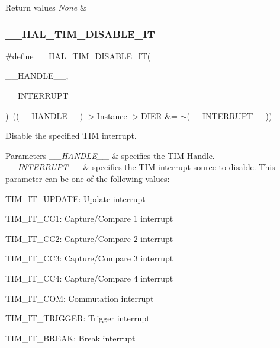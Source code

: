 \begin{DoxyRetVals}{Return values}
{\em None} & \\
\hline
\end{DoxyRetVals}
\mbox{\label{group___t_i_m___exported___macros_ga31d67e905bc62e3142179dc4bbf8ba64}} 
\subsubsection{\texorpdfstring{\+\_\+\+\_\+\+H\+A\+L\+\_\+\+T\+I\+M\+\_\+\+D\+I\+S\+A\+B\+L\+E\+\_\+\+IT}{\_\_HAL\_TIM\_DISABLE\_IT}}
{\footnotesize\ttfamily \#define \+\_\+\+\_\+\+H\+A\+L\+\_\+\+T\+I\+M\+\_\+\+D\+I\+S\+A\+B\+L\+E\+\_\+\+IT(\begin{DoxyParamCaption}\item[{}]{\+\_\+\+\_\+\+H\+A\+N\+D\+L\+E\+\_\+\+\_\+,  }\item[{}]{\+\_\+\+\_\+\+I\+N\+T\+E\+R\+R\+U\+P\+T\+\_\+\+\_\+ }\end{DoxyParamCaption})~((\+\_\+\+\_\+\+H\+A\+N\+D\+L\+E\+\_\+\+\_\+)-\/$>$Instance-\/$>$D\+I\+ER \&= $\sim$(\+\_\+\+\_\+\+I\+N\+T\+E\+R\+R\+U\+P\+T\+\_\+\+\_\+))}



Disable the specified T\+IM interrupt. 


\begin{DoxyParams}{Parameters}
{\em \+\_\+\+\_\+\+H\+A\+N\+D\+L\+E\+\_\+\+\_\+} & specifies the T\+IM Handle. \\
\hline
{\em \+\_\+\+\_\+\+I\+N\+T\+E\+R\+R\+U\+P\+T\+\_\+\+\_\+} & specifies the T\+IM interrupt source to disable. This parameter can be one of the following values\+: \begin{DoxyItemize}
\item T\+I\+M\+\_\+\+I\+T\+\_\+\+U\+P\+D\+A\+TE\+: Update interrupt \item T\+I\+M\+\_\+\+I\+T\+\_\+\+C\+C1\+: Capture/\+Compare 1 interrupt \item T\+I\+M\+\_\+\+I\+T\+\_\+\+C\+C2\+: Capture/\+Compare 2 interrupt \item T\+I\+M\+\_\+\+I\+T\+\_\+\+C\+C3\+: Capture/\+Compare 3 interrupt \item T\+I\+M\+\_\+\+I\+T\+\_\+\+C\+C4\+: Capture/\+Compare 4 interrupt \item T\+I\+M\+\_\+\+I\+T\+\_\+\+C\+OM\+: Commutation interrupt \item T\+I\+M\+\_\+\+I\+T\+\_\+\+T\+R\+I\+G\+G\+ER\+: Trigger interrupt \item T\+I\+M\+\_\+\+I\+T\+\_\+\+B\+R\+E\+AK\+: Break interrupt \end{DoxyItemize}
\\
\hline
\end{DoxyParams}

